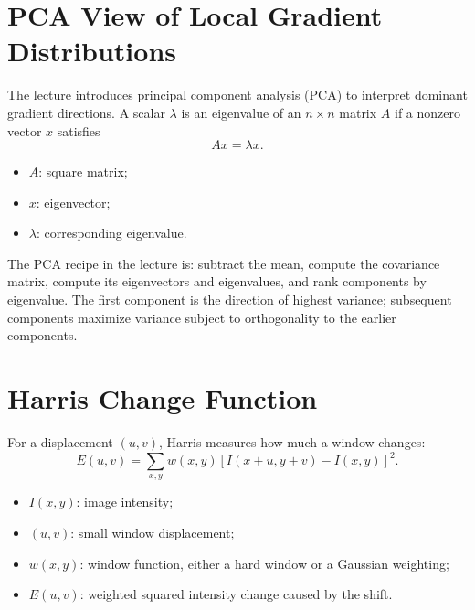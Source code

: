 \documentclass[11pt,a4paper,oneside]{report}
\newcommand{\mathlegend}[1]{%
  \par\vspace{0.2em}{\small\itshape where}\par
  \begin{itemize}[leftmargin=1.7em,topsep=0.15em,itemsep=0.12em]
  #1
  \end{itemize}
}
\begin{document}
\section{PCA View of Local Gradient Distributions}

The lecture introduces principal component analysis (PCA) to interpret dominant gradient directions. A scalar $\lambda$ is an eigenvalue of an $n\times n$ matrix $A$ if a nonzero vector $x$ satisfies
\begin{equation}
  Ax=\lambda x.
  \label{eq:pca-eigen}
\end{equation}
\mathlegend{
  \item $A$: square matrix;
  \item $x$: eigenvector;
  \item $\lambda$: corresponding eigenvalue.
}

The PCA recipe in the lecture is: subtract the mean, compute the covariance matrix, compute its eigenvectors and eigenvalues, and rank components by eigenvalue. The first component is the direction of highest variance; subsequent components maximize variance subject to orthogonality to the earlier components.

\section{Harris Change Function}

For a displacement $(u,v)$, Harris measures how much a window changes:
\begin{equation}
  E(u,v)=\sum_{x,y}w(x,y)\left[I(x+u,y+v)-I(x,y)\right]^2.
  \label{eq:harris-E}
\end{equation}
\mathlegend{
  \item $I(x,y)$: image intensity;
  \item $(u,v)$: small window displacement;
  \item $w(x,y)$: window function, either a hard window or a Gaussian weighting;
  \item $E(u,v)$: weighted squared intensity change caused by the shift.
}
\end{document}
